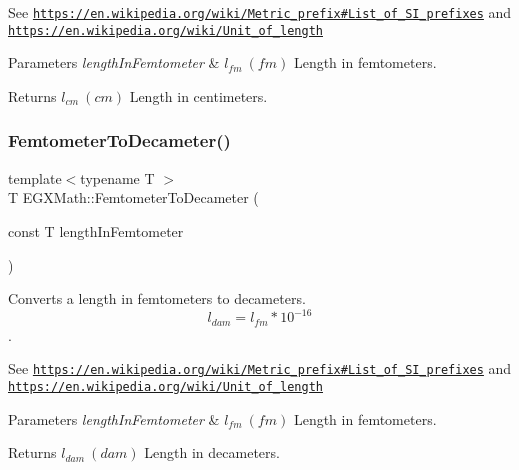 See \href{https://en.wikipedia.org/wiki/Metric_prefix#List_of_SI_prefixes}{\tt https\+://en.\+wikipedia.\+org/wiki/\+Metric\+\_\+prefix\#\+List\+\_\+of\+\_\+\+S\+I\+\_\+prefixes} and \href{https://en.wikipedia.org/wiki/Unit_of_length}{\tt https\+://en.\+wikipedia.\+org/wiki/\+Unit\+\_\+of\+\_\+length} 
\begin{DoxyParams}{Parameters}
{\em length\+In\+Femtometer} & $ l_{fm}\ (fm)$ Length in femtometers. \\
\hline
\end{DoxyParams}
\begin{DoxyReturn}{Returns}
$ l_{cm}\ (cm)$ Length in centimeters. 
\end{DoxyReturn}
\mbox{\label{group___e_g_x_math-_conversions-_length_conversions-_s_i-_femtometer-_s_i_ga8d583b77d39b4474a8081997067ffb66}} 
\subsubsection{\texorpdfstring{Femtometer\+To\+Decameter()}{FemtometerToDecameter()}}
{\footnotesize\ttfamily template$<$typename T $>$ \\
T E\+G\+X\+Math\+::\+Femtometer\+To\+Decameter (\begin{DoxyParamCaption}\item[{const T}]{length\+In\+Femtometer }\end{DoxyParamCaption})}



Converts a length in femtometers to decameters. \[ l_{dam}=l_{fm} * 10^{-16} \]. 

See \href{https://en.wikipedia.org/wiki/Metric_prefix#List_of_SI_prefixes}{\tt https\+://en.\+wikipedia.\+org/wiki/\+Metric\+\_\+prefix\#\+List\+\_\+of\+\_\+\+S\+I\+\_\+prefixes} and \href{https://en.wikipedia.org/wiki/Unit_of_length}{\tt https\+://en.\+wikipedia.\+org/wiki/\+Unit\+\_\+of\+\_\+length} 
\begin{DoxyParams}{Parameters}
{\em length\+In\+Femtometer} & $ l_{fm}\ (fm)$ Length in femtometers. \\
\hline
\end{DoxyParams}
\begin{DoxyReturn}{Returns}
$ l_{dam}\ (dam)$ Length in decameters. 
\end{DoxyReturn}
\mbox{\label{group___e_g_x_math-_conversions-_length_conversions-_s_i-_femtometer-_s_i_gad0f3dba7d53c7f17223b7f7b0f4db523}} 
